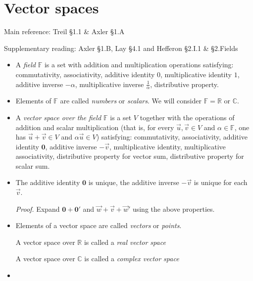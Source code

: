 \documentclass[11pt]{article}
\newcommand{\1}{\mathbf{1}}
\newcommand{\0}{\mathbf{0}}
\newcommand{\C}{\mathbb{C}}
\newcommand{\F}{\mathbb{F}}
\newcommand{\R}{\mathbb{R}}
\newcommand{\vu}{\vec{u}}
\newcommand{\vv}{\vec{v}}
\newcommand{\vw}{\vec{w}}
\begin{document}
\begin{itemize}
\end{itemize}


\clearpage
\section{Vector spaces}

Main reference:
Treil \S1.1
\&
Axler \S1.A\

Supplementary reading:
Axler \S1.B,
Lay \S4.1
and
Hefferon \S 2.I.1 \& \S2.Fields

\begin{itemize}

\item

A \emph{field} $\F$ is a set with addition and multiplication operations satisfying:
commutativity,
associativity,
additive identity $0$,
multiplicative identity $1$,
additive inverse $-\alpha$,
multiplicative inverse $\frac{1}{\alpha}$,
distributive property.

\item

Elements of $\F$ are called \emph{numbers} or \emph{scalars}.
We will consider $\F=\R$ or $\C$.

\item

A \emph{vector space over the field $\F$} is a set $V$ together with the operations of addition and 
scalar multiplication (that is, for every $\vu,\vv \in V$ and $\alpha\in\F$, one has $\vu+\vv \in V$ and $\alpha \vu \in V$) satisfying:
commutativity,
associativity,
additive identity $\0$,
additive inverse $-\vv$,
multiplicative identity,
multiplicative associativity,
distributive property for vector sum,
distributive property for scalar sum.

\item

The additive identity $\0$ is unique, the additive inverse $-\vv$ is unique for each $\vv$.

\emph{Proof.}
Expand $\0 + \0'$ and $\vw+\vv+\vw'$ using the above properties.

\item

Elements of a vector space are called \emph{vectors} or \emph{points}.

A vector space over $\R$ is called a \emph{real vector space}

A vector space over $\mathbb{C}$ is called a \emph{complex vector space}

\item


\end{itemize}
\end{document}
